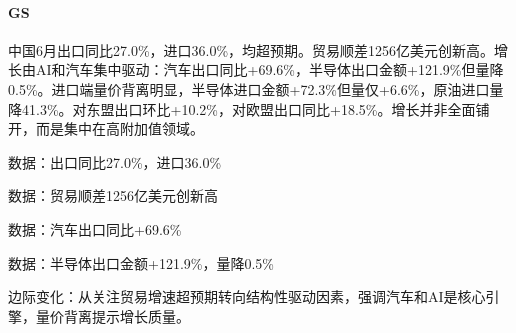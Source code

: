 \documentclass[11pt]{ctexart}
\begin{document}
\paragraph{GS} 中国6月出口同比27.0\%，进口36.0\%，均超预期。贸易顺差1256亿美元创新高。增长由AI和汽车集中驱动：汽车出口同比+69.6\%，半导体出口金额+121.9\%但量降0.5\%。进口端量价背离明显，半导体进口金额+72.3\%但量仅+6.6\%，原油进口量降41.3\%。对东盟出口环比+10.2\%，对欧盟出口同比+18.5\%。增长并非全面铺开，而是集中在高附加值领域。
{\small\color{refgray}数据：出口同比27.0\%，进口36.0\%\par}
{\small\color{refgray}数据：贸易顺差1256亿美元创新高\par}
{\small\color{refgray}数据：汽车出口同比+69.6\%\par}
{\small\color{refgray}数据：半导体出口金额+121.9\%，量降0.5\%\par}
{\small\color{refgray}边际变化：从关注贸易增速超预期转向结构性驱动因素，强调汽车和AI是核心引擎，量价背离提示增长质量。\par}
\end{document}
